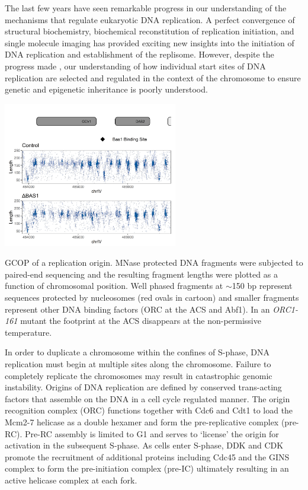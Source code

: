 The last few years have seen remarkable progress in our understanding of the mechanisms that regulate eukaryotic DNA replication.  A perfect convergence of structural biochemistry\citep{Bleichert2015-zl,Li2015-zi,Yuan2017-gq}, biochemical reconstitution of replication initiation\citep{Yeeles2015-pe,Devbhandari2017-fh,Azmi2017-gg}, and single molecule imaging\citep{Ticau2015-gg} has provided exciting new insights into the initiation of DNA replication and establishment of the replisome.  However, despite the progress made \invitro, our understanding of how individual start sites of DNA replication are selected and regulated in the context of the chromosome to ensure genetic and epigenetic inheritance is poorly understood\citep{Prioleau2016-bj}. \begin{floatingfigure}[lt]{3in}
\vspace{-4mm}
\begin{center}
\includegraphics[width=3in]{r35_figures/BAS1_GCV1_typhoon.png}
\end{center}
\vspace{3mm}
\caption{GCOP of a replication origin.  MNase protected DNA fragments were subjected to paired-end sequencing and the resulting fragment lengths were plotted as a function of chromosomal position.  Well phased fragments at $\sim$150 bp represent sequences protected by nucleosomes (red ovals in cartoon) and smaller fragments represent other DNA binding factors (\eg ORC at the ACS and Abf1).  In an \textit{ORC1-161} mutant the footprint at the ACS disappears at the non-permissive temperature.}%
\end{floatingfigure}%

In order to duplicate a chromosome within the confines of S-phase, DNA replication must begin at multiple sites along the chromosome.  Failure to completely replicate the chromosomes may result in catastrophic genomic instability\citep{Green2010-ht}.  Origins of DNA replication are defined by conserved trans-acting factors that assemble on the DNA in  a cell cycle regulated manner. %
The origin recognition complex (ORC) functions together with Cdc6 and Cdt1 to load the Mcm2-7 helicase as a double hexamer and form the pre-replicative complex (pre-RC)\citep{Bell2013-pk}. Pre-RC assembly is limited to G1 and serves to `license' the origin for activation in the subsequent S-phase\citep{Siddiqui2013-jz}. As cells enter S-phase, DDK and CDK promote the recruitment of additional proteins including Cdc45 and the GINS complex to form the pre-initiation complex (pre-IC)\citep{Tanaka2013-fl} ultimately resulting in an active helicase complex at each fork.   

